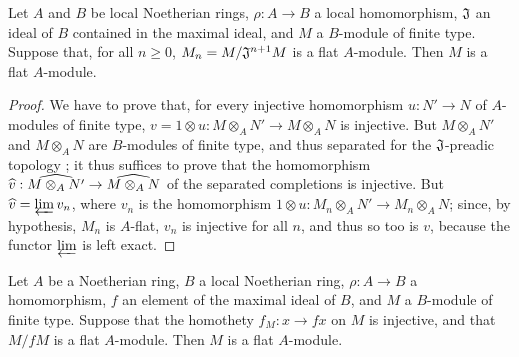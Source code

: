 \begin{prop}[10.2.6]
\label{0.10.2.6}
Let $A$ and $B$ be local Noetherian rings, $\rho:A\to B$ a local homomorphism, $\mathfrak{J}$ an ideal of $B$ contained in the maximal ideal, and $M$ a $B$-module of finite type.
Suppose that, for all $n\geq0$, $M_n=M/\mathfrak{J}^{n+1}M$ is a flat $A$-module.
Then $M$ is a flat $A$-module.
\end{prop}

\begin{proof}
\label{proof-0.10.2.6}
We have to prove that, for every injective homomorphism $u:N'\to N$ of $A$-modules of finite type, $v=1\otimes u:M\otimes_A N'\to M\otimes_A N$ is injective.
But $M\otimes_A N'$ and $M\otimes_A N$ are $B$-modules of finite type, and thus separated for the $\mathfrak{J}$-preadic topology ;
it thus suffices to prove that the homomorphism $\wh{v}:\wh{M\otimes_A N'}\to\wh{M\otimes_A N}$ of the separated completions is injective.
But ${\widehat{v}}=\varprojlim v_n$, where $v_n$ is the homomorphism $1\otimes u:M_n\otimes_A N'\to M_n\otimes_A N$;
since, by hypothesis, $M_n$ is $A$-flat, $v_n$ is injective for all $n$, and thus so too is $v$, because the functor $\varprojlim$ is left exact.
\end{proof}

\begin{cor}[10.2.7]
\label{0.10.2.7}
Let $A$ be a Noetherian ring, $B$ a local Noetherian ring, $\rho:A\to B$ a homomorphism, $f$ an element of the maximal ideal of $B$, and $M$ a $B$-module of finite type.
Suppose that the homothety $f_M:x\to fx$ on $M$ is injective, and that $M/fM$ is a flat $A$-module.
Then $M$ is a flat $A$-module.
\end{cor}

